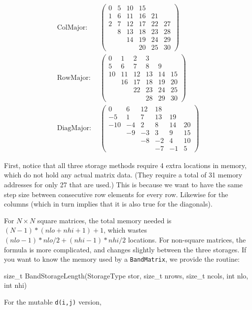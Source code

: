 \documentclass[twoside,letterpaper,11pt]{article}
\renewcommand{\tt}[1]{{\lstinline {#1}}}
\begin{document}
\begin{align*}
\textrm{ColMajor:} ~ ~ & \left(\begin{array}{cccccc}0 & 5 & 10 & 15 &  &  \\1 & 6 & 11 & 16 & 21 &  \\2 & 7 & 12 & 17 & 22 & 27 \\ & 8 & 13 & 18 & 23 & 28 \\ &  & 14 & 19 & 24 & 29 \\ &  &  & 20 & 25 & 30\end{array}\right) \\
\textrm{RowMajor:} ~  ~ & \left(\begin{array}{cccccc}0 & 1 & 2 & 3 &  &  \\ 5 & 6 & 7 & 8 & 9 &  \\ 10 & 11 & 12 & 13 & 14 & 15 \\ & 16 & 17 & 18 & 19 & 20 \\ &  & 22 & 23 & 24 & 25 \\ &  &  & 28 & 29 & 30\end{array}\right) \\
\textrm{DiagMajor:} ~  ~ & \left(\begin{array}{cccccc}0 & 6 & 12 & 18 &  &  \\-5 & 1 & 7 & 13 & 19 &  \\ -10 & -4 & 2 & 8 & 14 & 20 \\ & -9 & -3 & 3 & 9 & 15 \\ &  & -8 & -2 & 4 & 10 \\ &  &  & -7 & -1 & 5\end{array}\right)
\end{align*}

First, notice that all three storage methods require 4 extra locations in memory, 
which do not hold
any actual matrix data.  
(They require a total of 31 memory addresses for only 27 that are used.)
This is because we want to have the same step size between consecutive row elements
for every row.  Likewise for the columns (which in turn implies that it is also 
true for the diagonals).

For $N\times N$ square matrices, the total memory needed is $(N-1)*(nlo+nhi+1)+1$, 
which wastes $(nlo-1)*nlo/2 + (nhi-1)*nhi/2$ locations.  For non-square
matrices, the formula is more complicated, and changes slightly between the 
three storages.
If you want to know the memory used by a \tt{BandMatrix}, we provide the routine:
\begin{tmvcode}
size_t BandStorageLength(StorageType stor, size_t nrows, size_t ncols, 
        int nlo, int nhi)
\end{tmvcode}
For the mutable \tt{d(i,j)} version, 
  
\end{document}
